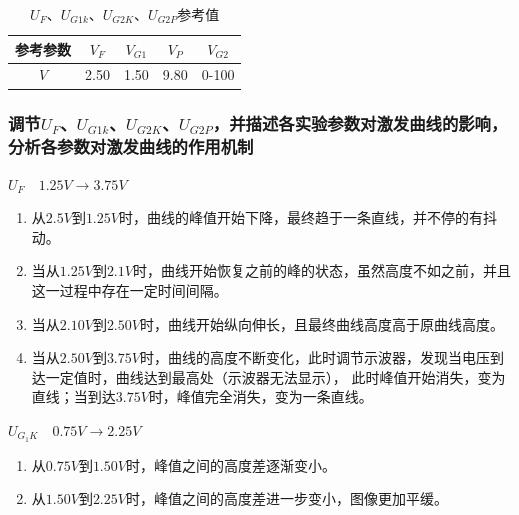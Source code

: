 \documentclass[a4paper,UTF8]{ctexart}
\begin{document}
\begin{table}[htb]
    \begin{center}
        \begin{tabular}{|c|c|c|c|c|}
            \hline
            \bfseries 参考参数 & $V_F$ & $V_{G1}$ & $V_P$ & $V_{G2}$ \\
            \hline
            \bfseries $V$ & 2.50 & 1.50 & 9.80 & 0-100 \\
            \hline
        \end{tabular}
    \end{center}
    \caption{$U_F$、$U_{G1k}$、$U_{G2K}$、$U_{G2P}$参考值}
\end{table}

\subsubsection{调节$U_F$、$U_{G1k}$、$U_{G2K}$、$U_{G2P}$，并描述各实验参数对激发曲线的影响，分析各参数对激发曲线的作用机制}

{\uppercase\expandafter{}  \bfseries $U_{F} \quad 1.25V \longrightarrow 3.75V$}
\begin{framed}
\begin{enumerate}
    \item 从$2.5V$到$1.25V$时，曲线的峰值开始下降，最终趋于一条直线，并不停的有抖动。
    \item 当从$1.25V$到$2.1V时$，曲线开始恢复之前的峰的状态，虽然高度不如之前，并且这一过程中存在一定时间间隔。
    \item 当从$2.10V$到$2.50V$时，曲线开始纵向伸长，且最终曲线高度高于原曲线高度。
    \item 当从$2.50V$到$3.75V$时，曲线的高度不断变化，此时调节示波器，发现当电压到达一定值时，曲线达到最高处（示波器无法显示），
    此时峰值开始消失，变为直线；当到达$3.75V$时，峰值完全消失，变为一条直线。
\end{enumerate}
\end{framed}

{\uppercase\expandafter{} \bfseries $U_{G_{1}K} \quad 0.75V \longrightarrow 2.25V$}

\begin{framed}
\begin{enumerate}
    \item 从$0.75V$到$1.50V$时，峰值之间的高度差逐渐变小。
    \item 从$1.50V$到$2.25V$时，峰值之间的高度差进一步变小，图像更加平缓。
\end{enumerate}    
\end{framed}
\end{document}
